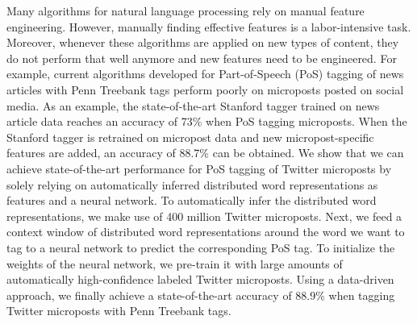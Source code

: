 \documentclass[10pt, a4paper, twopage, headinclude, footinclude, BCOR5mm]{book}
\begin{document}
\begin{table}[t!]
\end{table} 
\begin{table}[t!]
\end{table} 
\noindent
Many algorithms for natural language processing rely on manual feature engineering. However, manually finding effective features is a labor-intensive task. Moreover, whenever these algorithms are applied on new types of content, they do not perform that well anymore and new features need to be engineered. For example, current algorithms developed for Part-of-Speech (PoS) tagging of news articles with Penn Treebank tags perform poorly on microposts posted on social media. As an example, the state-of-the-art Stanford tagger trained on news article data reaches an accuracy of 73\% when PoS tagging microposts. When the Stanford tagger is retrained on micropost data and new micropost-specific features are added, an accuracy of 88.7\% can be obtained.   We show that we can achieve state-of-the-art performance for PoS tagging of Twitter microposts by solely relying on automatically inferred distributed word representations as features and a neural network. To automatically infer the distributed word representations, we make use of 400 million Twitter microposts. Next, we feed a context window of distributed word representations around the word we want to tag to a neural network to predict the corresponding PoS tag. To initialize the weights of the neural network, we pre-train it with large amounts of automatically high-confidence labeled Twitter microposts. Using a data-driven approach, we finally achieve a state-of-the-art accuracy of 88.9\% when tagging Twitter microposts with Penn Treebank tags.  
\end{document}
